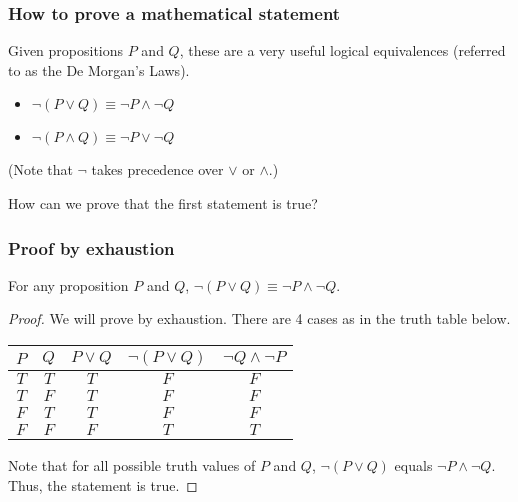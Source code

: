 \begin{frame}\frametitle{How to prove a mathematical statement}
  Given propositions $P$ and $Q$, these are a very useful logical
  equivalences (referred to as the De Morgan's Laws).

  \begin{itemize}
  \item $\neg (P\vee Q)\equiv \neg P \wedge \neg Q$
  \item $\neg (P\wedge Q)\equiv \neg P \vee \neg Q$
  \end{itemize}

  (Note that $\neg$ takes precedence over $\vee$ or $\wedge$.)

  \vspace{0.2in}
  
  How can we prove that the first statement is true?
\end{frame}

\begin{frame}\frametitle{Proof by exhaustion}
  \begin{tcolorbox}
    For any proposition $P$ and $Q$, $\neg (P\vee Q)\equiv \neg P
    \wedge \neg Q$.
  \end{tcolorbox}
  \begin{proof}
    We will prove by exhaustion.  There are 4 cases as in the truth
    table below.

    \vspace{0.1in}
    
    \begin{tabular}{|c|c||c|c|c|}
      \hline
      $P$ & $Q$ & $P\vee Q$ & $\neg(P\vee Q)$ & $\neg Q \wedge \neg P$ \\
      \hline
      $T$ & $T$ & $T$ & $F$ & $F$ \\
      $T$ & $F$ & $T$ & $F$ & $F$ \\
      $F$ & $T$ & $T$ & $F$ & $F$ \\
      $F$ & $F$ & $F$ & $T$ & $T$ \\
      \hline
    \end{tabular}

    \vspace{0.1in}

    Note that for all possible truth values of $P$ and $Q$, $\neg
    (P\vee Q)$ equals $\neg P \wedge \neg Q$.  Thus, the statement is
    true.
  \end{proof}
\end{frame}
